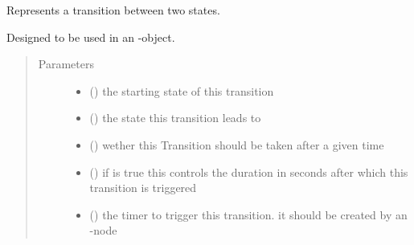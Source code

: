 \documentclass[a4paper,12pt,english]{article}
\begin{document}

\begin{fulllineitems}
\label{\detokenize{osbk_operation:osbk_operation.utility.Transition}}
Represents a transition between two states.

Designed to be used in an -object.
\begin{quote}\begin{description}
\item[{Parameters}] \leavevmode\begin{itemize}
\item {} 
 ({\hyperref[\detokenize{osbk_operation:osbk_operation.utility.State}]{}}) \textendash{} the starting state of this transition

\item {} 
 ({\hyperref[\detokenize{osbk_operation:osbk_operation.utility.State}]{}}) \textendash{} the state this transition leads to

\item {} 
 () \textendash{} wether this Transition should be taken after a given time

\item {} 
 () \textendash{} if  is true this controls the duration in seconds after which this
transition is triggered

\item {} 
 () \textendash{} the timer to trigger this transition. it should be created by an 
-node


\end{itemize}
\end{description}
\end{quote}
\end{fulllineitems}
\end{document}
